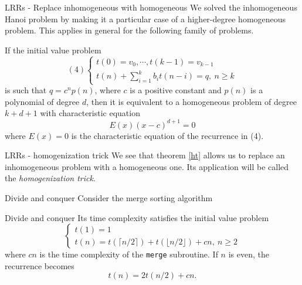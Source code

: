\documentclass{beamer}
\begin{document}
\begin{frame}{LRRs - Replace inhomogeneous with homogeneous}
	We solved the inhomogeneous Hanoi problem by making it a particular case
	of a higher-degree homogeneous problem. This applies in general for the
	following family of problems.
	\begin{thm}[2]\label{ht}
		If the initial value problem
		\begin{displaymath}(4)
			\begin{cases}
				t(0)= v_0, \cdots, t(k-1)= v_{k-1}\\
				t(n) + \sum_{i= 1}^k b_it(n-i)= q,\ n \geq k
			\end{cases}
		\end{displaymath}
		is such that $q = c^np(n)$, where $c$ is a positive constant and
		$p(n)$ is a polynomial of degree $d$, then it is equivalent to a
		homogeneous problem of degree $k+d+1$ with characteristic equation
		\begin{equation*}
			E(x)(x-c)^{d+1} = 0
		\end{equation*}
		where $E(x) = 0$ is the characteristic equation of the recurrence
		in (4).
	\end{thm}
\end{frame}

%

\begin{frame}{LRRs - homogenization trick}
	We see that theorem \ref{ht} allows us to replace an inhomogeneous problem
	with a homogeneous one. Its application will be called the
	\emph{homogenization trick}.
\end{frame}

\begin{frame}{Divide and conquer}
	Consider the merge sorting algorithm
	
\end{frame}

%

\begin{frame}{Divide and conquer}
	Its time complexity satisfies the initial value problem
	\begin{displaymath}
		\begin{cases}
			t(1)= 1\\
			t(n)= t\left( \lceil n/2 \rceil \right) +
			t\left( \lfloor n/2 \rfloor \right) + cn,\ n \geq 2
		\end{cases}
	\end{displaymath}
	where $cn$ is the time complexity of the \texttt{merge} subroutine.
	If $n$ is even, the recurrence becomes
	\[
		t(n)= 2t(n/2) + cn.
	\]
\end{frame}
\end{document}

